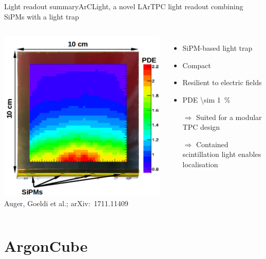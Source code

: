 \documentclass[]{beamer}
\newcommand*{\emphcol}{red}
\newcommand*{\AC}{{ArgonCube}}
\newcommand*{\AL}{{ArCLight}}
\newcommand*{\lartpc}{{LArTPC}}
\begin{document}
\begin{frame}{Light readout summary}{\AL{}, a novel \lartpc{} light readout combining SiPMs with a light trap}
	\begin{columns}[c]
		\centering
		\includegraphics[width=\textwidth]{arclight/PDE}\\
		{\tiny Auger, Goeldi et al.; arXiv:~1711.11409~\cite{arclight}}
		\begin{itemize}
			\item SiPM-based light trap
			\item Compact
			\item Resilient to electric fields
			\item PDE \SI{\sim 1}{\percent}
			\item[$\Rightarrow$] Suited for a modular TPC design
			\item[$\Rightarrow$] {\color{\emphcol} Contained scintillation light enables localisation}
		\end{itemize}
	\end{columns}
\end{frame}

\section{\AC{}}
\end{document}
